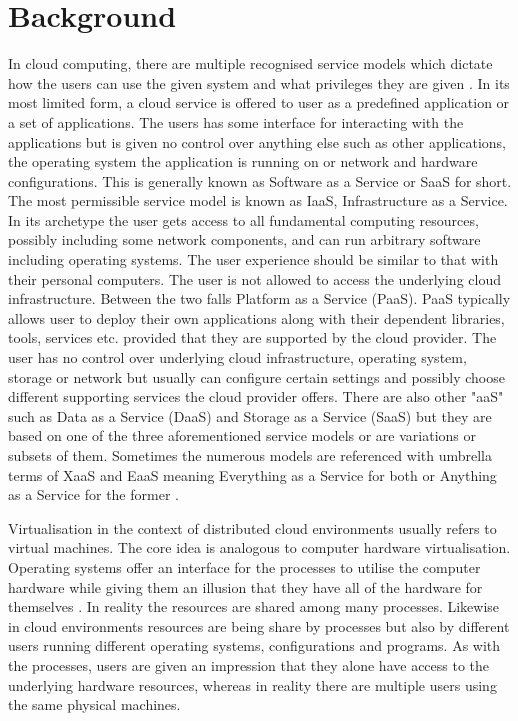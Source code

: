 \section{Background} \label{background}

			In cloud computing, there are multiple recognised service models which dictate how the users can use the given system and what privileges they are given \cite{Mell:2011:SND:2206223}. In its most limited form, a cloud service is offered to user as a predefined application or a set of applications. The users has some interface for interacting with the applications but is given no control over anything else such as other applications, the operating system the application is running on or network and hardware configurations. This is generally known as Software as a Service or SaaS for short. The most permissible service model is known as IaaS, Infrastructure as a Service. In its archetype the user gets access to all fundamental computing resources, possibly including some network components, and can run arbitrary software including operating systems. The user experience should be similar to that with their personal computers. The user is not allowed to access the underlying cloud infrastructure. Between the two falls Platform as a Service (PaaS). PaaS typically allows user to deploy their own applications along with their dependent libraries, tools, services etc. provided that they are supported by the cloud provider. The user has no control over underlying cloud infrastructure, operating system, storage or network but usually can configure certain settings and possibly choose different supporting services the cloud provider offers. There are also other "aaS" such as Data as a Service (DaaS) and Storage as a Service (SaaS) but they are based on one of the three aforementioned service models or are variations or subsets of them. Sometimes the numerous models are referenced with umbrella terms of XaaS and EaaS meaning Everything as a Service for both or Anything as a Service for the former \cite{XaaS}.

Virtualisation in the context of distributed cloud environments usually refers to virtual machines. The core idea is analogous to computer hardware virtualisation. Operating systems offer an interface for the processes to utilise the computer hardware while giving them an illusion that they have all of the hardware for themselves \cite{ArpaciDusseau14-Book}. In reality the resources are shared among many processes. Likewise in cloud environments resources are being share by processes but also by different users running different operating systems, configurations and programs. As with the processes, users are given an impression that they alone have access to the underlying hardware resources, whereas in reality there are multiple users using the same physical machines.


